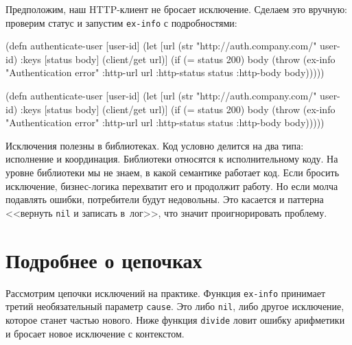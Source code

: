 Предположим, наш HTTP-клиент не бросает исключение. Сделаем это вручную:
проверим статус и запустим \verb|ex-info| с подробностями:


\ifx\DEVICETYPE\MOBILE

\begin{english}
  \begin{clojure}
(defn authenticate-user [user-id]
  (let [url (str
              "http://auth.company.com/"
              user-id)
        {:keys [status body]}
        (client/get url)]
    (if (= status 200)
      body
      (throw (ex-info
               "Authentication error"
               {:http-url url
                :http-status status
                :http-body body})))))
  \end{clojure}
\end{english}

\else

\begin{english}
  \begin{clojure}
(defn authenticate-user [user-id]
  (let [url (str "http://auth.company.com/" user-id)
        {:keys [status body]} (client/get url)]
    (if (= status 200)
      body
      (throw (ex-info "Authentication error"
                      {:http-url url
                       :http-status status
                       :http-body body})))))
  \end{clojure}
\end{english}

\fi

Исключения полезны в библиотеках. Код условно делится на два типа: исполнение и
координация. Библиотеки относятся к исполнительному коду. На уровне библиотеки
мы не знаем, в какой семантике работает код. Если бросить исключение,
бизнес-логика перехватит его и продолжит работу. Но если молча подавлять ошибки,
потребители будут недовольны. Это касается и паттерна <<вернуть \verb|nil| и
записать в~лог>>, что значит проигнорировать проблему.

\section{Подробнее о цепочках}


Рассмотрим цепочки исключений на практике. Функция \verb|ex-info|
принимает третий необязательный параметр \verb|cause|. Это либо \verb|nil|,
либо другое исключение, которое станет частью нового. Ниже функция
\verb|divide| ловит ошибку арифметики и бросает новое исключение с контекстом.

